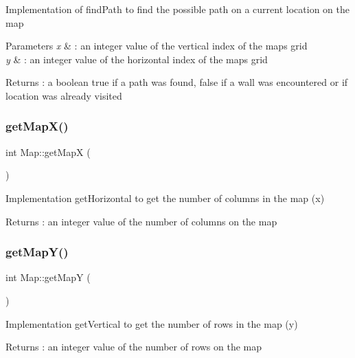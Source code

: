 Implementation of find\+Path to find the possible path on a current location on the map 
\begin{DoxyParams}{Parameters}
{\em x} & \+: an integer value of the vertical index of the map\textquotesingle{}s grid \\
\hline
{\em y} & \+: an integer value of the horizontal index of the map\textquotesingle{}s grid \\
\hline
\end{DoxyParams}
\begin{DoxyReturn}{Returns}
\+: a boolean true if a path was found, false if a wall was encountered or if location was already visited 
\end{DoxyReturn}
\hypertarget{class_map_a5f45c5651757dbc8c2a1b3387cc35ced}{}\label{class_map_a5f45c5651757dbc8c2a1b3387cc35ced} 
\subsubsection{\texorpdfstring{get\+Map\+X()}{getMapX()}}
{\footnotesize\ttfamily int Map\+::get\+MapX (\begin{DoxyParamCaption}{ }\end{DoxyParamCaption})}

Implementation get\+Horizontal to get the number of columns in the map (x) \begin{DoxyReturn}{Returns}
\+: an integer value of the number of columns on the map 
\end{DoxyReturn}
\hypertarget{class_map_af8a681239a6799298e90f2d735809dd2}{}\label{class_map_af8a681239a6799298e90f2d735809dd2} 
\subsubsection{\texorpdfstring{get\+Map\+Y()}{getMapY()}}
{\footnotesize\ttfamily int Map\+::get\+MapY (\begin{DoxyParamCaption}{ }\end{DoxyParamCaption})}

Implementation get\+Vertical to get the number of rows in the map (y) \begin{DoxyReturn}{Returns}
\+: an integer value of the number of rows on the map 
\end{DoxyReturn}
\hypertarget{class_map_a3406173205ffe290a65db538e466e60d}{}\label{class_map_a3406173205ffe290a65db538e466e60d} 
